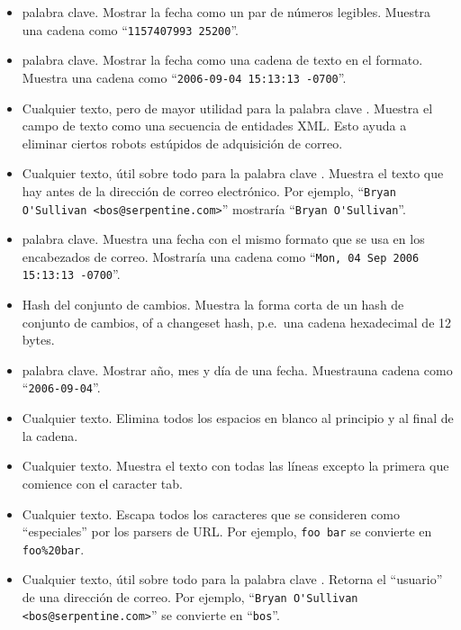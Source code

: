 {{\begin{itemize}
\item[\tplkwfilt{date}{hgdate}]  palabra clave.
  Mostrar la fecha como un par de números legibles.  Muestra una
  cadena como ``\Verb+1157407993 25200+''.
\item[\tplkwfilt{date}{isodate}]  palabra clave.
  Mostrar la fecha como una cadena de texto en el formato.  Muestra
  una cadena como ``\Verb+2006-09-04 15:13:13 -0700+''.
\item[\tplfilter{obfuscate}] Cualquier texto, pero de mayor utilidad
  para la palabra clave .  Muestra el campo de texto
  como una secuencia de entidades XML.  Esto ayuda a eliminar ciertos
  robots estúpidos de adquisición de correo.
\item[\tplkwfilt{author}{person}] Cualquier texto, útil sobre todo
  para la palabra clave .  Muestra el texto que hay
  antes de la dirección de correo electrónico.  Por ejemplo,
  ``\Verb+Bryan O'Sullivan <bos@serpentine.com>+'' mostraría
  ``\Verb+Bryan O'Sullivan+''.
\item[\tplkwfilt{date}{rfc822date}]  palabra clave.
  Muestra una fecha con el mismo formato que se usa en los encabezados
  de correo.  Mostraría una cadena como
 ``\Verb+Mon, 04 Sep 2006 15:13:13 -0700+''.
\item[\tplkwfilt{node}{short}] Hash del conjunto de cambios.  Muestra
  la forma corta de un hash de conjunto de cambios, 
  of a changeset hash, p.e.~una cadena hexadecimal de 12 bytes.
\item[\tplkwfilt{date}{shortdate}]  palabra clave.
  Mostrar año, mes y día de una fecha.  Muestrauna cadena como
  ``\Verb+2006-09-04+''.
\item[\tplfilter{strip}] Cualquier texto.  Elimina todos los espacios
  en blanco al principio y al final de la cadena.
\item[\tplfilter{tabindent}] Cualquier texto.  Muestra el texto con
  todas las líneas excepto la primera que comience con el caracter tab.
\item[\tplfilter{urlescape}] Cualquier texto.  Escapa todos los
  caracteres que se consideren como ``especiales'' por los parsers de
  URL.  Por ejemplo, \Verb+foo bar+ se convierte en \Verb+foo%
\item[\tplkwfilt{author}{user}] Cualquier texto, útil sobre todo para
  la palabra clave .  Retorna el ``usuario'' de una
  dirección de correo.  Por ejemplo, 
  ``\Verb+Bryan O'Sullivan <bos@serpentine.com>+'' se convierte en 
  ``\Verb+bos+''.
\end{itemize}

}}
